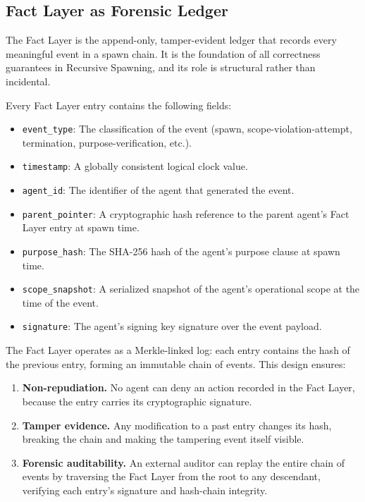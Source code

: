 \subsection{Fact Layer as Forensic Ledger}
\label{sec:fact_forensic}

The Fact Layer is the append-only, tamper-evident ledger that records every meaningful event in a spawn chain. It is the foundation of all correctness guarantees in Recursive Spawning, and its role is structural rather than incidental.

Every Fact Layer entry contains the following fields:

\begin{itemize}
    \item \texttt{event\_type}: The classification of the event (spawn, scope-violation-attempt, termination, purpose-verification, etc.).
    \item \texttt{timestamp}: A globally consistent logical clock value.
    \item \texttt{agent\_id}: The identifier of the agent that generated the event.
    \item \texttt{parent\_pointer}: A cryptographic hash reference to the parent agent's Fact Layer entry at spawn time.
    \item \texttt{purpose\_hash}: The SHA-256 hash of the agent's purpose clause at spawn time.
    \item \texttt{scope\_snapshot}: A serialized snapshot of the agent's operational scope at the time of the event.
    \item \texttt{signature}: The agent's signing key signature over the event payload.
\end{itemize}

The Fact Layer operates as a Merkle-linked log: each entry contains the hash of the previous entry, forming an immutable chain of events. This design ensures:

\begin{enumerate}
    \item \textbf{Non-repudiation.} No agent can deny an action recorded in the Fact Layer, because the entry carries its cryptographic signature.
    \item \textbf{Tamper evidence.} Any modification to a past entry changes its hash, breaking the chain and making the tampering event itself visible.
    \item \textbf{Forensic auditability.} An external auditor can replay the entire chain of events by traversing the Fact Layer from the root to any descendant, verifying each entry's signature and hash-chain integrity.
\end{enumerate}

